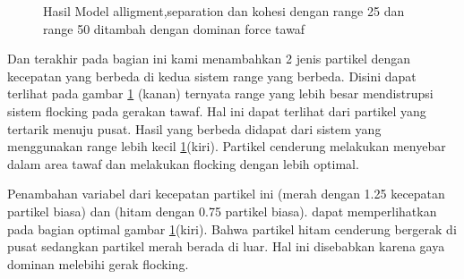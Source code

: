 \begin{figure}

\caption{Hasil Model alligment,separation dan kohesi dengan range 25 dan range 50 ditambah dengan dominan force tawaf}
\label{fig:2grafikmodel4gaya}
\end{figure}

Dan terakhir pada bagian ini kami menambahkan 2 jenis partikel dengan kecepatan yang berbeda di kedua sistem range yang berbeda. Disini dapat terlihat pada gambar \ref{fig:2grafikmodel4gaya} (kanan) ternyata range yang lebih besar mendistrupsi sistem flocking pada gerakan tawaf. Hal ini dapat terlihat dari partikel yang tertarik menuju pusat. Hasil yang berbeda didapat dari sistem yang menggunakan range lebih kecil \ref{fig:2grafikmodel4gaya}(kiri). Partikel cenderung melakukan menyebar dalam area tawaf dan melakukan flocking dengan lebih optimal. 

Penambahan variabel dari kecepatan partikel ini (merah dengan 1.25 kecepatan partikel biasa) dan (hitam dengan 0.75 partikel biasa). dapat memperlihatkan pada bagian optimal gambar  \ref{fig:2grafikmodel4gaya}(kiri). Bahwa partikel hitam cenderung bergerak di pusat sedangkan partikel merah berada di luar. Hal ini disebabkan karena gaya dominan melebihi gerak flocking.

